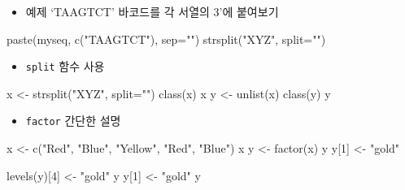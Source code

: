 \documentclass[
]{book}
\newenvironment{Shaded}{\begin{snugshade}}{\end{snugshade}}
\newcommand{\AttributeTok}[1]{\textcolor[rgb]{0.77,0.63,0.00}{#1}}
\newcommand{\DecValTok}[1]{\textcolor[rgb]{0.00,0.00,0.81}{#1}}
\newcommand{\FunctionTok}[1]{\textcolor[rgb]{0.00,0.00,0.00}{#1}}
\newcommand{\NormalTok}[1]{#1}
\newcommand{\OtherTok}[1]{\textcolor[rgb]{0.56,0.35,0.01}{#1}}
\newcommand{\StringTok}[1]{\textcolor[rgb]{0.31,0.60,0.02}{#1}}
\providecommand{\tightlist}{%
  \setlength{\itemsep}{0pt}\setlength{\parskip}{0pt}}
\begin{document}
\begin{itemize}
\tightlist
\item
  예제 `TAAGTCT' 바코드를 각 서열의 3'에 붙여보기
\end{itemize}

\begin{Shaded}
\begin{Highlighting}[]
\FunctionTok{paste}\NormalTok{(myseq, }\FunctionTok{c}\NormalTok{(}\StringTok{"TAAGTCT"}\NormalTok{), }\AttributeTok{sep=}\StringTok{""}\NormalTok{)}
\FunctionTok{strsplit}\NormalTok{(}\StringTok{"XYZ"}\NormalTok{, }\AttributeTok{split=}\StringTok{""}\NormalTok{)}
\end{Highlighting}
\end{Shaded}

\begin{itemize}
\tightlist
\item
  \texttt{split} 함수 사용
\end{itemize}

\begin{Shaded}
\begin{Highlighting}[]
\NormalTok{x }\OtherTok{\textless{}{-}} \FunctionTok{strsplit}\NormalTok{(}\StringTok{"XYZ"}\NormalTok{, }\AttributeTok{split=}\StringTok{""}\NormalTok{)}
\FunctionTok{class}\NormalTok{(x)}
\NormalTok{x}
\NormalTok{y }\OtherTok{\textless{}{-}} \FunctionTok{unlist}\NormalTok{(x)}
\FunctionTok{class}\NormalTok{(y)}
\NormalTok{y}
\end{Highlighting}
\end{Shaded}

\begin{itemize}
\tightlist
\item
  \texttt{factor} 간단한 설명
\end{itemize}

\begin{Shaded}
\begin{Highlighting}[]
\NormalTok{x }\OtherTok{\textless{}{-}} \FunctionTok{c}\NormalTok{(}\StringTok{"Red"}\NormalTok{, }\StringTok{"Blue"}\NormalTok{, }\StringTok{"Yellow"}\NormalTok{, }\StringTok{"Red"}\NormalTok{, }\StringTok{"Blue"}\NormalTok{)}
\NormalTok{x}
\NormalTok{y }\OtherTok{\textless{}{-}} \FunctionTok{factor}\NormalTok{(x)}
\NormalTok{y}
\NormalTok{y[}\DecValTok{1}\NormalTok{] }\OtherTok{\textless{}{-}} \StringTok{"gold"}

\FunctionTok{levels}\NormalTok{(y)[}\DecValTok{4}\NormalTok{] }\OtherTok{\textless{}{-}} \StringTok{"gold"}
\NormalTok{y}
\NormalTok{y[}\DecValTok{1}\NormalTok{] }\OtherTok{\textless{}{-}} \StringTok{"gold"}
\NormalTok{y}
\end{Highlighting}
\end{Shaded}
\end{document}
